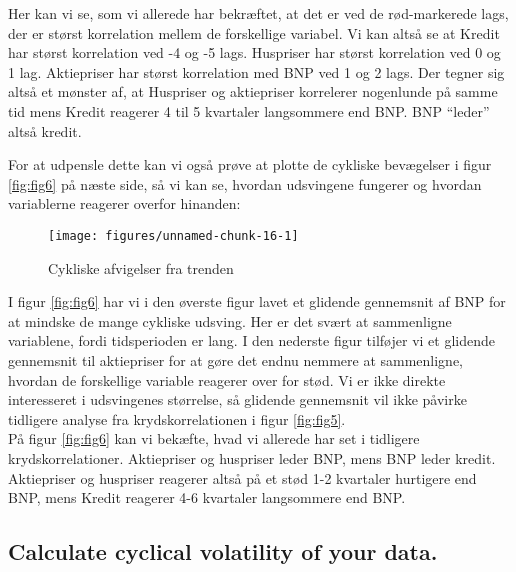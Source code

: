 \documentclass[
  10pt,
]{article}
\begin{document}
Her kan vi se, som vi allerede har bekræftet, at det er ved de
rød-markerede lags, der er størst korrelation mellem de forskellige
variabel. Vi kan altså se at Kredit har størst korrelation ved -4 og -5
lags. Huspriser har størst korrelation ved 0 og 1 lag. Aktiepriser har
størst korrelation med BNP ved 1 og 2 lags. Der tegner sig altså et
mønster af, at Huspriser og aktiepriser korrelerer nogenlunde på samme
tid mens Kredit reagerer 4 til 5 kvartaler langsommere end BNP. BNP
``leder'' altså kredit.

For at udpensle dette kan vi også prøve at plotte de cykliske bevægelser
i figur \ref{fig:fig6} på næste side, så vi kan se, hvordan udsvingene
fungerer og hvordan variablerne reagerer overfor hinanden:

\begin{figure}[H]

{\centering \texttt{[image: figures/unnamed-chunk-16-1]} 

}

\caption{\label{fig:fig6}Cykliske afvigelser fra trenden}\label{fig:unnamed-chunk-16}
\end{figure}

I figur \ref{fig:fig6} har vi i den øverste figur lavet et glidende
gennemsnit af BNP for at mindske de mange cykliske udsving. Her er det
svært at sammenligne variablene, fordi tidsperioden er lang. I den
nederste figur tilføjer vi et glidende gennemsnit til aktiepriser for at
gøre det endnu nemmere at sammenligne, hvordan de forskellige variable
reagerer over for stød. Vi er ikke direkte interesseret i udsvingenes
størrelse, så glidende gennemsnit vil ikke påvirke tidligere analyse fra
krydskorrelationen i figur \ref{fig:fig5}.\\
På figur \ref{fig:fig6} kan vi bekæfte, hvad vi allerede har set i
tidligere krydskorrelationer. Aktiepriser og huspriser leder BNP, mens
BNP leder kredit. Aktiepriser og huspriser reagerer altså på et stød 1-2
kvartaler hurtigere end BNP, mens Kredit reagerer 4-6 kvartaler
langsommere end BNP.

\newpage

\hypertarget{calculate-cyclical-volatility-of-your-data.}{%
\subsection{Calculate cyclical volatility of your
data.}\label{calculate-cyclical-volatility-of-your-data.}}

\leavevmode
\end{document}
